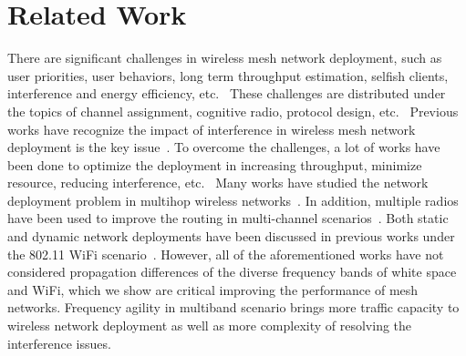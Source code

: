 

\section{Related Work}
\label{sec:related}

There are significant challenges in wireless mesh network deployment,
such as user priorities, user behaviors, long term throughput estimation, selfish clients,
interference and energy efficiency, etc.~\cite{tragos2013spectrum}
These challenges are distributed under the topics of channel assignment,
cognitive radio, protocol design, etc.~\cite{tragos2013spectrum,akyildiz2006next}
Previous works have recognize the impact of interference in 
wireless mesh network deployment is the key issue~\cite{tang2005interference,irwin2013resource,chieochan2013channel}.
To overcome the challenges, a lot of works have been done to optimize the 
deployment in increasing throughput, minimize resource, reducing interference,
etc.~\cite{irwin2013resource,subramanian2008minimum,doraghinejad2014channel}
Many works have studied the network deployment problem in multihop wireless
networks~\cite{jain2005impact,akyildiz2005wireless,raniwala2004centralized,tragos2013spectrum}.
In addition, multiple radios have been used to improve the routing in multi-channel
scenarios~\cite{draves2004routing,irwin2013resource}. 
Both static and dynamic network deployments have been discussed in previous works under
the 802.11 WiFi scenario~\cite{wu2006analysis,ramachandran2006interference,subramanian2008minimum}. 
However, all of the aforementioned works have not considered propagation 
differences of the diverse frequency bands of white space and WiFi, which we show are 
critical improving the performance of mesh networks.
Frequency agility in 
multiband scenario brings more traffic capacity to wireless network deployment
as well as more complexity of resolving the interference issues.

